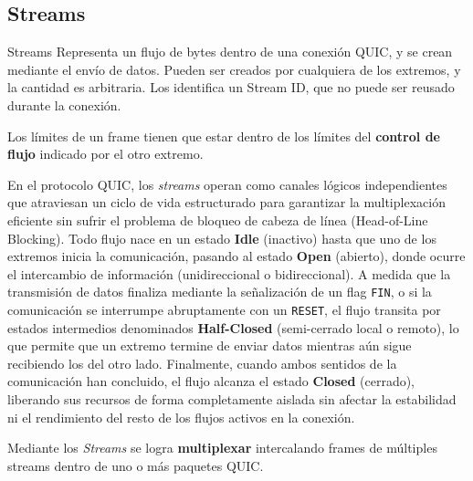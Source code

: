 \subsection{Streams}

\begin{definicion}{Streams}
    Representa un flujo de bytes dentro de una conexión QUIC, y se crean mediante el envío de datos. Pueden ser creados por cualquiera de los extremos, y la cantidad es arbitraria. Los identifica un Stream ID, que no puede ser reusado durante la conexión. 
\end{definicion}

Los límites de un frame tienen que estar dentro de los límites del \textbf{control de flujo} indicado por el otro extremo. 


\begin{tcolorbox}[
    enhanced,
    colback=blue!3!white,         %
    colframe=blue!60!black,       %
    title=\textbf{Ciclo de Vida y Estados de un Stream en QUIC},
    fonttitle=\large\sffamily,    %
    coltitle=white,
    boxrule=1.2pt,
    arc=6pt,                      %
    drop shadow=black!15!white,   %
    left=10pt, right=10pt, top=10pt, bottom=10pt
]
En el protocolo QUIC, los \textit{streams} operan como canales lógicos independientes que atraviesan un ciclo de vida estructurado para garantizar la multiplexación eficiente sin sufrir el problema de bloqueo de cabeza de línea (Head-of-Line Blocking). Todo flujo nace en un estado \textbf{Idle} (inactivo) hasta que uno de los extremos inicia la comunicación, pasando al estado \textbf{Open} (abierto), donde ocurre el intercambio de información (unidireccional o bidireccional). A medida que la transmisión de datos finaliza mediante la señalización de un flag \texttt{FIN}, o si la comunicación se interrumpe abruptamente con un \texttt{RESET}, el flujo transita por estados intermedios denominados \textbf{Half-Closed} (semi-cerrado local o remoto), lo que permite que un extremo termine de enviar datos mientras aún sigue recibiendo los del otro lado. Finalmente, cuando ambos sentidos de la comunicación han concluido, el flujo alcanza el estado \textbf{Closed} (cerrado), liberando sus recursos de forma completamente aislada sin afectar la estabilidad ni el rendimiento del resto de los flujos activos en la conexión.

\end{tcolorbox}

Mediante los \emph{Streams} se logra \textbf{multiplexar} intercalando frames de múltiples streams dentro de uno o más paquetes QUIC.


